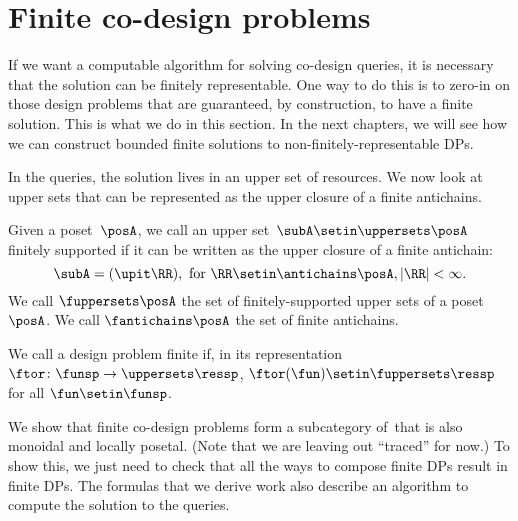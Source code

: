 \section{Finite co-design problems}

If we want a computable algorithm for solving co-design queries, it is necessary that the solution can be finitely representable.
One way to do this is to zero-in on those design problems that are guaranteed, by construction, to have a finite solution.
This is what we do in this section.
In the next chapters, we will see how we can construct bounded finite solutions to non-finitely-representable DPs.

In the \FixFunMinRes queries, the solution lives in an upper set of resources.
We now look at upper sets that can be represented as the upper closure of a finite antichains.

\begin{definition}
    \label{def:fuppersets}
    Given a poset~$\posA$, we call an upper set~$\subA \setin \uppersets \posA$ finitely supported
    if it can be written as the upper closure of a finite antichain:
    \begin{equation}
        \subA = (\upit\RR), \text{ for } \RR \setin \antichains \posA, |\RR| < \infty.
    \end{equation}
    We call $\fuppersets \posA$ the set of finitely-supported upper sets of a poset~$\posA$.
    We call $\fantichains \posA$ the set of finite antichains.
\end{definition}

\begin{definition}
    We call a design problem finite if, in its representation $\ftor \colon \funsp \to \uppersets \ressp$,
    $\ftor(\fun) \setin \fuppersets\ressp$ for all $\fun\setin\funsp$.
\end{definition}

We show that finite co-design problems form a subcategory of~\DP that is also monoidal and locally posetal.
(Note that we are leaving out ``traced'' for now.) To show this, we just need to check that all the ways to compose finite DPs result in finite DPs.
The formulas that we derive work also describe an algorithm to compute the solution to the queries.

